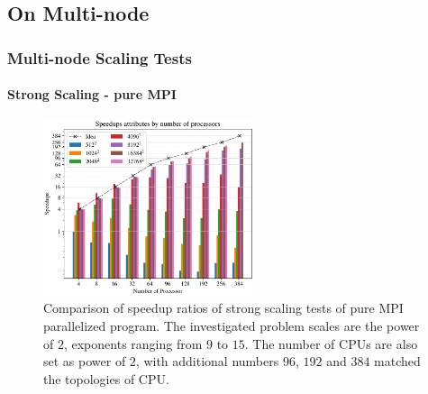 \subsection{On Multi-node}
\begin{frame}
  \frametitle{Multi-node Scaling Tests}
  \framesubtitle{Strong Scaling - pure MPI}

  \begin{figure}[htbp]
    \centering
    \includegraphics[width=0.55\textwidth]{figure/FIG_Benchmark_pure_mpi_multi_nodes.pdf}
    \caption{
      Comparison of speedup ratios of strong scaling tests of pure MPI parallelized program. 
      The investigated problem scales are the power of $2$, exponents ranging from $9$ to $15$.
      The number of CPUs are also set as power of $2$, with additional numbers $96$, $192$ and $384$ matched the topologies of CPU.
    }
    \label{FIG:Benchmark:PURE_MPI_Multi_Node}
  \end{figure}
\end{frame}



